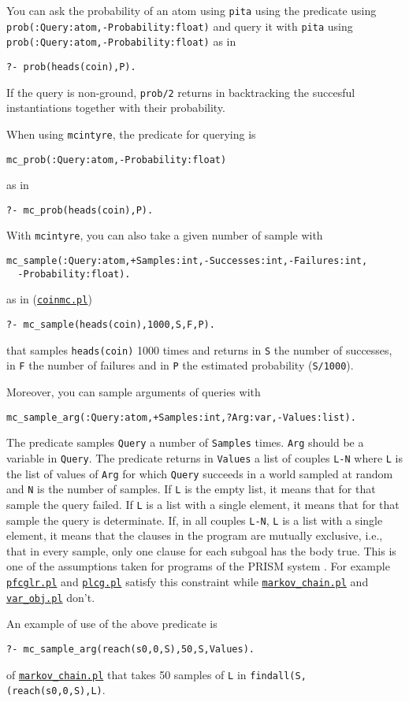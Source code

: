 You can ask the probability of an atom using \verb|pita| using the predicate using \verb| prob(:Query:atom,-Probability:float)|
and query it with \verb|pita| using \verb| prob(:Query:atom,-Probability:float)| as in
\begin{verbatim}
?- prob(heads(coin),P).
\end{verbatim}
If the query is non-ground, \verb|prob/2| returns in backtracking the succesful instantiations together with their probability.

When using \verb|mcintyre|, the predicate for querying is 
\begin{verbatim}
mc_prob(:Query:atom,-Probability:float)
\end{verbatim} as in
\begin{verbatim}
?- mc_prob(heads(coin),P).
\end{verbatim}
With \verb|mcintyre|, you can also take a given number of sample with
\begin{verbatim}
mc_sample(:Query:atom,+Samples:int,-Successes:int,-Failures:int,
  -Probability:float).
\end{verbatim}
as in (\href{http://cplint.lamping.unife.it/example/inference/coinmc.pl}{\texttt{coinmc.pl}})
\begin{verbatim}
?- mc_sample(heads(coin),1000,S,F,P).
\end{verbatim}
that samples \verb|heads(coin)| 1000 times and returns in \verb|S| the number of successes, in \verb|F| the number of failures and in \verb|P| the
estimated probability (\verb|S/1000|).

Moreover, you can sample arguments of queries with
\begin{verbatim}
mc_sample_arg(:Query:atom,+Samples:int,?Arg:var,-Values:list).
\end{verbatim}
The predicate samples \verb|Query| a number of \verb|Samples| times. 
\verb|Arg| should be a variable in \verb|Query|.
The predicate returns in \verb|Values| a list of couples \verb|L-N| where
\verb|L| is the list of values of \verb|Arg| for which \verb|Query|
succeeds in a world sampled at random and \verb|N|
is the number of samples.
If \verb|L| is the empty list, it means that for that
sample the query failed. 
If \verb|L| is a list with a 
single element, it means that for that sample the query is 
determinate. 
If, in all couples \verb|L-N|, \verb|L| 
is a list with a 
single element, it means that the clauses in the program 
are mutually exclusive, i.e., that in every sample, only
one clause for each subgoal has the body true. This is one
of the assumptions taken for programs of the PRISM system \cite{DBLP:journals/jair/SatoK01}.
For example
\href{http://cplint.lamping.unife.it/example/inference/pfcglr.pl}{\texttt{pfcglr.pl}} and \href{http://cplint.lamping.unife.it/example/inference/plcg.pl}{\texttt{plcg.pl}} satisfy this constraint while
 \href{http://cplint.lamping.unife.it/example/inference/markov_chain.pl}{\texttt{markov\_chain.pl}} and \href{http://cplint.lamping.unife.it/example/inference/var_obj.pl}{\texttt{var\_obj.pl}} don't.


An example of use of the above predicate is
\begin{verbatim}
?- mc_sample_arg(reach(s0,0,S),50,S,Values). 
\end{verbatim}
of \href{http://cplint.lamping.unife.it/example/inference/markov_chain.pl}{\texttt{markov\_chain.pl}}
that takes 50 samples of \verb|L| in \verb|findall(S,(reach(s0,0,S),L)|.
